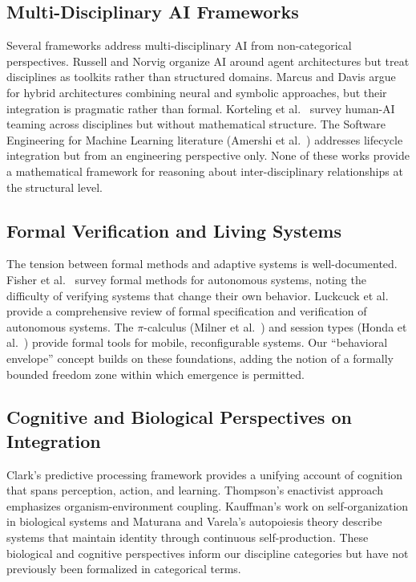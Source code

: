 \documentclass[11pt,a4paper]{article}
\begin{document}
\subsection{Multi-Disciplinary AI Frameworks}

Several frameworks address multi-disciplinary AI from non-categorical perspectives. Russell and Norvig \cite{russell2020} organize AI around agent architectures but treat disciplines as toolkits rather than structured domains. Marcus and Davis \cite{marcus2019} argue for hybrid architectures combining neural and symbolic approaches, but their integration is pragmatic rather than formal. Korteling et al.\ \cite{korteling2021} survey human-AI teaming across disciplines but without mathematical structure. The Software Engineering for Machine Learning literature (Amershi et al.\ \cite{amershi2019}) addresses lifecycle integration but from an engineering perspective only. None of these works provide a mathematical framework for reasoning about inter-disciplinary relationships at the structural level.

\subsection{Formal Verification and Living Systems}

The tension between formal methods and adaptive systems is well-documented. Fisher et al.\ \cite{fisher2013} survey formal methods for autonomous systems, noting the difficulty of verifying systems that change their own behavior. Luckcuck et al.\ \cite{luckcuck2019} provide a comprehensive review of formal specification and verification of autonomous systems. The $\pi$-calculus (Milner et al.\ \cite{milner1992}) and session types (Honda et al.\ \cite{honda1998}) provide formal tools for mobile, reconfigurable systems. Our ``behavioral envelope'' concept builds on these foundations, adding the notion of a formally bounded freedom zone within which emergence is permitted.

\subsection{Cognitive and Biological Perspectives on Integration}

Clark's \cite{clark2013} predictive processing framework provides a unifying account of cognition that spans perception, action, and learning. Thompson's \cite{thompson2007} enactivist approach emphasizes organism-environment coupling. Kauffman's \cite{kauffman1993} work on self-organization in biological systems and Maturana and Varela's \cite{maturana1980} autopoiesis theory describe systems that maintain identity through continuous self-production. These biological and cognitive perspectives inform our discipline categories but have not previously been formalized in categorical terms.
\end{document}
